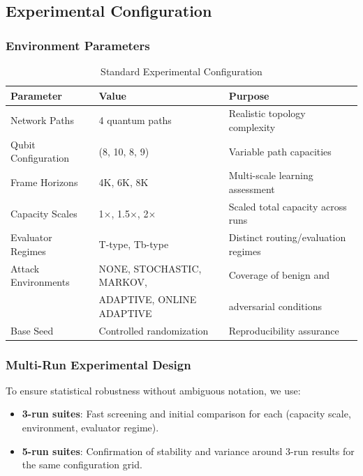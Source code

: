 \documentclass[12pt,a4paper]{article}
\begin{document}
\subsection{Experimental Configuration}

\subsubsection{Environment Parameters}

\begin{table}[H]
\centering
\caption{Standard Experimental Configuration}
\begin{tabular}{|l|l|l|}
\hline
\textbf{Parameter} & \textbf{Value} & \textbf{Purpose} \\
\hline
\hline
Network Paths & 4 quantum paths & Realistic topology complexity \\
Qubit Configuration & (8, 10, 8, 9) & Variable path capacities \\
Frame Horizons & 4K, 6K, 8K & Multi-scale learning assessment \\
Capacity Scales & 1$\times$, 1.5$\times$, 2$\times$ & Scaled total capacity across runs \\
Evaluator Regimes & T-type, Tb-type & Distinct routing/evaluation regimes \\
Attack Environments & NONE, STOCHASTIC, MARKOV, & Coverage of benign and \\
 & ADAPTIVE, ONLINE ADAPTIVE & adversarial conditions \\
Base Seed & Controlled randomization & Reproducibility assurance \\
\hline
\end{tabular}
\end{table}

\subsubsection{Multi-Run Experimental Design}

To ensure statistical robustness without ambiguous notation, we use:

\begin{itemize}
\item \textbf{3-run suites}: Fast screening and initial comparison for each (capacity scale, environment, evaluator regime).
\item \textbf{5-run suites}: Confirmation of stability and variance around 3-run results for the same configuration grid.
\end{itemize}
\end{document}
